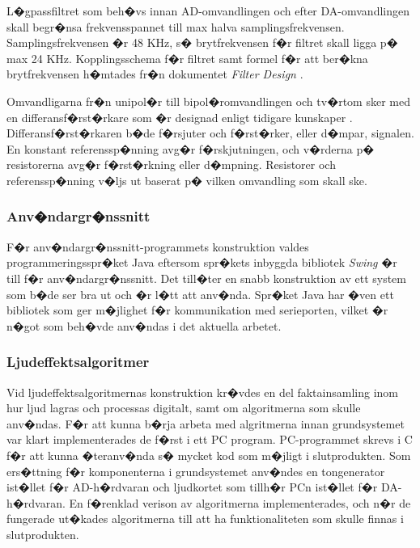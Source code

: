 \documentclass[a4paper]{article}
\begin{document}
L�gpassfiltret som beh�vs innan AD-omvandlingen och efter DA-omvandlingen skall begr�nsa frekvensspannet till max halva samplingsfrekvensen. Samplingsfrekvensen �r 48 KHz, s� brytfrekvensen f�r filtret skall ligga p� max 24 KHz. Kopplingsschema f�r filtret samt formel f�r att ber�kna brytfrekvensen h�mtades fr�n dokumentet \emph{Filter Design} \cite{FilterDesign}.

Omvandligarna fr�n unipol�r till bipol�romvandlingen och tv�rtom sker med en differansf�rst�rkare som �r designad enligt tidigare kunskaper \cite{OperationalAmplifiers}. Differansf�rst�rkaren b�de f�rsjuter och f�rst�rker, eller d�mpar, signalen. En konstant referenssp�nning avg�r f�rskjutningen, och v�rderna p� resistorerna avg�r f�rst�rkning eller d�mpning. Resistorer och referenssp�nning v�ljs ut baserat p� vilken omvandling som skall ske.

\newpage
\subsubsection{Anv�ndargr�nssnitt} 
F�r anv�ndargr�nssnitt-programmets konstruktion valdes programmeringsspr�ket Java eftersom spr�kets inbyggda bibliotek \emph{Swing} �r till f�r anv�ndargr�nssnitt. Det till�ter en snabb konstruktion av ett system som b�de ser bra ut och �r l�tt att anv�nda. Spr�ket Java har �ven ett bibliotek som ger m�jlighet f�r kommunikation med serieporten, vilket �r n�got som beh�vde anv�ndas i det aktuella arbetet.

\subsubsection{Ljudeffektsalgoritmer}
Vid ljudeffektsalgoritmernas konstruktion kr�vdes en del faktainsamling inom hur ljud lagras och processas digitalt, samt om algoritmerna som skulle anv�ndas. F�r att kunna b�rja arbeta med algritmerna innan grundsystemet var klart implementerades de f�rst i ett PC program. PC-programmet skrevs i C f�r att kunna �teranv�nda s� mycket kod som m�jligt i slutprodukten. Som ers�ttning f�r komponenterna i grundsystemet anv�ndes en tongenerator ist�llet f�r AD-h�rdvaran och ljudkortet som tillh�r PCn ist�llet f�r DA-h�rdvaran. En f�renklad verison av algoritmerna implementerades, och n�r de fungerade ut�kades algoritmerna till att ha funktionaliteten som skulle finnas i slutprodukten.
\end{document}
